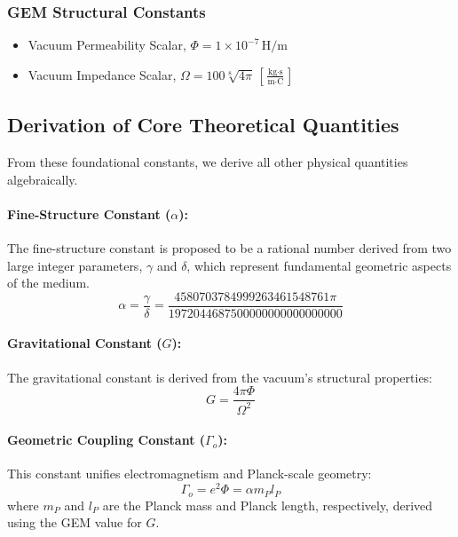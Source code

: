 \documentclass[12pt]{article}
\begin{document}
\subsubsection{GEM Structural Constants}
\begin{itemize}
    \item Vacuum Permeability Scalar, $\Phi = 1 \times 10^{-7} \, \text{H/m}$
    \item Vacuum Impedance Scalar, $\Omega = 100\sqrt[8]{4\pi} \, \left[\frac{\text{kg} \cdot \text{s}}{\text{m} \cdot \text{C}}\right]$
\end{itemize}

\subsection{Derivation of Core Theoretical Quantities}

From these foundational constants, we derive all other physical quantities algebraically.

\paragraph{Fine-Structure Constant ($\alpha$):} The fine-structure constant is proposed to be a rational number derived from two large integer parameters, $\gamma$ and $\delta$, which represent fundamental geometric aspects of the medium.
\begin{equation}
\alpha = \frac{\gamma}{\delta} = \frac{4580703784999263461548761 \pi}{1972044687500000000000000000}
\end{equation}

\paragraph{Gravitational Constant ($G$):} The gravitational constant is derived from the vacuum's structural properties:
\begin{equation}
G = \frac{4\pi\Phi}{\Omega^{2}}
\end{equation}

\paragraph{Geometric Coupling Constant ($\Gamma_o$):} This constant unifies electromagnetism and Planck-scale geometry:
\begin{equation}
\Gamma_o = e^2 \Phi = \alpha m_P l_P
\end{equation}
where $m_P$ and $l_P$ are the Planck mass and Planck length, respectively, derived using the GEM value for $G$.
\end{document}
